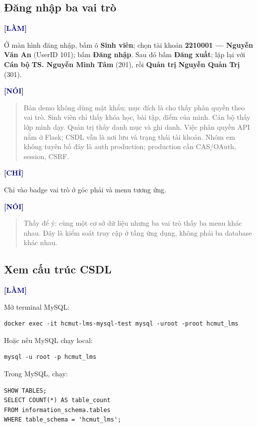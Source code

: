 \documentclass[a4paper,13pt]{extarticle}
\newcommand{\code}[1]{\texttt{\detokenize{#1}}}
\newcommand{\cue}[1]{\par\smallskip\noindent\textbf{\textcolor{navy}{[#1]}}\par\nopagebreak\smallskip}
\newenvironment{loi}{\begin{quote}\setlength{\parindent}{0pt}}{\end{quote}}
\begin{document}
\subsection{Đăng nhập ba vai trò}

\cue{LÀM}
Ở màn hình đăng nhập, bấm ô \textbf{Sinh viên}; chọn tài khoản \textbf{2210001 --- Nguyễn Văn An} (UserID 101); bấm \textbf{Đăng nhập}. Sau đó bấm \textbf{Đăng xuất}; lặp lại với \textbf{Cán bộ} \textbf{TS. Nguyễn Minh Tâm} (201), rồi \textbf{Quản trị} \textbf{Nguyễn Quản Trị} (301).

\cue{NÓI}
\begin{loi}
Bản demo không dùng mật khẩu; mục đích là cho thấy phân quyền theo vai trò. Sinh viên chỉ thấy khóa học, bài tập, điểm của mình. Cán bộ thấy lớp mình dạy. Quản trị thấy danh mục và ghi danh. Việc phân quyền API nằm ở Flask; CSDL vẫn là nơi lưu \code{Role} và trạng thái tài khoản. Nhóm em không tuyên bố đây là auth production; production cần CAS/OAuth, session, CSRF.
\end{loi}

\cue{CHỈ}
Chỉ vào badge vai trò ở góc phải và menu tương ứng.

\cue{NÓI}
\begin{loi}
Thầy để ý: cùng một cơ sở dữ liệu nhưng ba vai trò thấy ba menu khác nhau. Đây là kiểm soát truy cập ở tầng ứng dụng, không phải ba database khác nhau.
\end{loi}

\subsection{Xem cấu trúc CSDL}

\cue{LÀM}
Mở terminal MySQL:

\begin{lstlisting}[style=shell]
docker exec -it hcmut-lms-mysql-test mysql -uroot -proot hcmut_lms
\end{lstlisting}

Hoặc nếu MySQL chạy local:

\begin{lstlisting}[style=shell]
mysql -u root -p hcmut_lms
\end{lstlisting}

Trong MySQL, chạy:

\begin{lstlisting}[style=sql]
SHOW TABLES;
SELECT COUNT(*) AS table_count
FROM information_schema.tables
WHERE table_schema = 'hcmut_lms';
\end{lstlisting}
\end{document}

